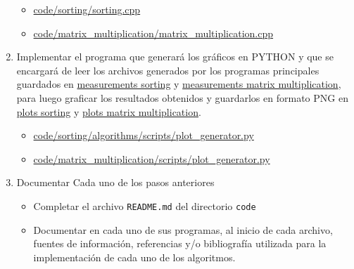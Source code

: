 \begin{enumerate}[(1)]
    \begin{itemize}
        \item \href{https://github.com/pabloealvarez/INF221-2025-1-TAREA-1/blob/master/code/sorting/sorting.cpp}{code/sorting/sorting.cpp}
        \item \href{https://github.com/pabloealvarez/INF221-2025-1-TAREA-1/blob/master/code/matrix_multiplication/matrix_multiplication.cpp}{code/matrix\_multiplication/matrix\_multiplication.cpp}
    \end{itemize}
    
    \item Implementar el programa que generará los gráficos en PYTHON y que se encargará de leer los archivos generados por los programas principales guardados en  \href{https://github.com/pabloealvarez/INF221-2025-1-TAREA-1/blob/master/code/sorting/data/measurements/}{measurements sorting} y \href{https://github.com/pabloealvarez/INF221-2025-1-TAREA-1/blob/master/code/sortmatrix+multiplication/data/measurements/}{measurements matrix multiplication}, para luego graficar los resultados obtenidos y guardarlos en formato PNG en  \href{https://github.com/pabloealvarez/INF221-2025-1-TAREA-1/blob/master/code/sorting/data/plots/}{plots sorting} y \href{https://github.com/pabloealvarez/INF221-2025-1-TAREA-1/blob/master/code/sortmatrix+multiplication/data/plots/}{plots matrix multiplication}.
    \begin{itemize}
        \item \href{https://github.com/pabloealvarez/INF221-2025-1-TAREA-1/blob/master/code/sorting/scripts/array_generator.py}{code/sorting/algorithms/scripts/plot\_generator.py}
        \item \href{https://github.com/pabloealvarez/INF221-2025-1-TAREA-1/blob/master/code/matrix_multiplication/scripts/matrix_generator.py}{code/matrix\_multiplication/scripts/plot\_generator.py}
    \end{itemize}
    \item Documentar Cada uno de los pasos anteriores
    \begin{itemize}
        \item Completar el archivo \texttt{README.md} del directorio \texttt{code}
        \item Documentar en cada uno de sus programas, al inicio de cada archivo, fuentes de información, referencias y/o bibliografía utilizada para la implementación de cada uno de los algoritmos.
    \end{itemize}
\end{enumerate}

